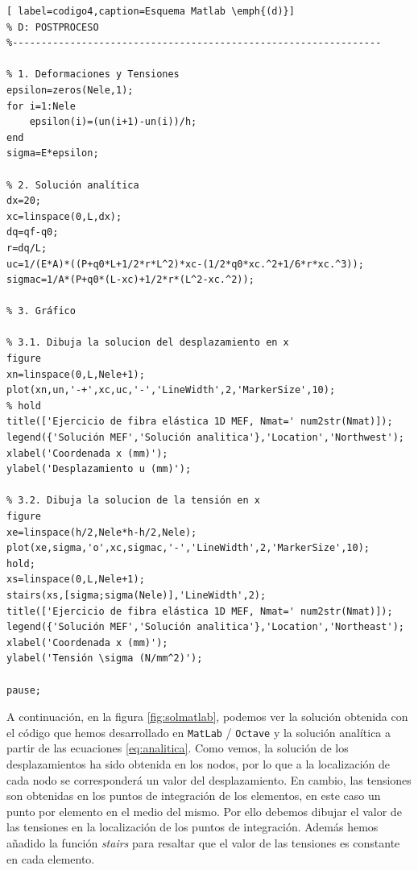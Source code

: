 \documentclass[spanish,a4paper,12pt]{article}
\begin{document}
\begin{itemize}
\begin{lstlisting}[ label=codigo4,caption=Esquema Matlab \emph{(d)}]
% D: POSTPROCESO
%----------------------------------------------------------------

% 1. Deformaciones y Tensiones
epsilon=zeros(Nele,1);
for i=1:Nele
    epsilon(i)=(un(i+1)-un(i))/h;
end
sigma=E*epsilon;

% 2. Solución analítica
dx=20;
xc=linspace(0,L,dx);
dq=qf-q0;
r=dq/L;
uc=1/(E*A)*((P+q0*L+1/2*r*L^2)*xc-(1/2*q0*xc.^2+1/6*r*xc.^3));
sigmac=1/A*(P+q0*(L-xc)+1/2*r*(L^2-xc.^2));

% 3. Gráfico

% 3.1. Dibuja la solucion del desplazamiento en x
figure 
xn=linspace(0,L,Nele+1);
plot(xn,un,'-+',xc,uc,'-','LineWidth',2,'MarkerSize',10);
% hold
title(['Ejercicio de fibra elástica 1D MEF, Nmat=' num2str(Nmat)]);
legend({'Solución MEF','Solución analitica'},'Location','Northwest');
xlabel('Coordenada x (mm)');
ylabel('Desplazamiento u (mm)');

% 3.2. Dibuja la solucion de la tensión en x
figure
xe=linspace(h/2,Nele*h-h/2,Nele); 
plot(xe,sigma,'o',xc,sigmac,'-','LineWidth',2,'MarkerSize',10);
hold;
xs=linspace(0,L,Nele+1);
stairs(xs,[sigma;sigma(Nele)],'LineWidth',2);
title(['Ejercicio de fibra elástica 1D MEF, Nmat=' num2str(Nmat)]);
legend({'Solución MEF','Solución analitica'},'Location','Northeast');
xlabel('Coordenada x (mm)');
ylabel('Tensión \sigma (N/mm^2)');

pause;

\end{lstlisting}

A continuación, en la figura \ref{fig:solmatlab}, podemos ver la solución obtenida con el código que hemos desarrollado en \texttt{MatLab} / \texttt{Octave} y la solución analítica a partir de las ecuaciones \eqref{eq:analitica}. Como vemos, la solución de los desplazamientos ha sido obtenida en los nodos, por lo que a la localización de cada nodo se corresponderá un valor del desplazamiento. En cambio, las tensiones son obtenidas en los puntos de integración de los elementos, en este caso un punto por elemento en el medio del mismo. Por ello debemos dibujar el valor de las tensiones en la localización de los puntos de integración. Además hemos añadido la función \emph{stairs} para resaltar que el valor de las tensiones es constante en cada elemento.


\end{itemize}
\end{document}
